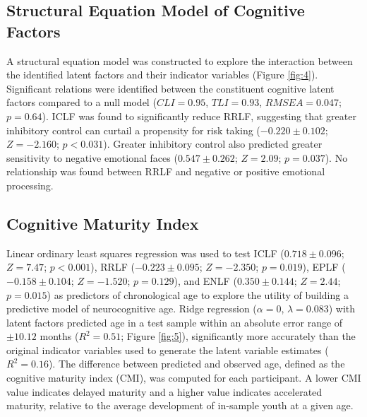 \documentclass[utf8]{frontiersSCNS} %
\begin{document}
\subsection{Structural Equation Model of Cognitive Factors} A structural equation model was constructed to explore the interaction between the identified latent factors and their indicator variables (Figure \ref{fig:4}). Significant relations were identified between the constituent cognitive latent factors compared to a null model ($CLI = 0.95$, $TLI = 0.93$, $RMSEA = 0.047$; $p = 0.64$). ICLF was found to significantly reduce RRLF, suggesting that greater inhibitory control can curtail a propensity for risk taking ($-0.220\pm0.102$; $Z=-2.160$; $p<0.031$). Greater inhibitory control also predicted greater sensitivity to negative emotional faces ($0.547\pm0.262$; $Z=2.09$; $p = 0.037$). No relationship was found between RRLF and negative or positive emotional processing.
\subsection{Cognitive Maturity Index} Linear ordinary least squares regression was used to test ICLF ($0.718\pm0.096$; $Z=7.47$; $p<0.001$), RRLF ($-0.223\pm0.095$; $Z=-2.350$; $p = 0.019$), EPLF ($-0.158\pm0.104$; $Z=-1.520$; $p=0.129$), and ENLF ($0.350\pm0.144$; $Z=2.44$; $p=0.015$) as predictors of chronological age to explore the utility of building a predictive model of neurocognitive age. Ridge regression ($\alpha = 0$, $\lambda = 0.083$) with latent factors predicted age in a test sample within an absolute error range of $\pm 10.12$ months ($R^2=0.51$; Figure \ref{fig:5}), significantly more accurately than the original indicator variables used to generate the latent variable estimates ($R^2=0.16$). The difference between predicted and observed age,  defined as the cognitive maturity index (CMI), was computed for each participant. A lower CMI value indicates delayed maturity and a higher value indicates accelerated maturity, relative to the average development of in-sample youth at a given age. 
\end{document}
